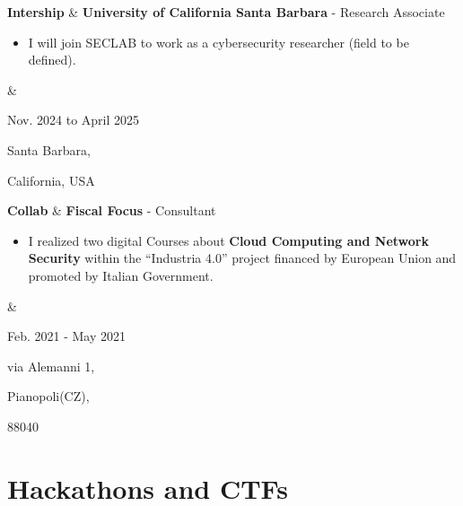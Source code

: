 \documentclass[10pt, letterpaper]{article}
\newenvironment{highlights}{
        \begin{itemize}[
                topsep=0pt,
                parsep=0.10 cm,
                partopsep=0pt,
                itemsep=0pt,
                after=\vspace{-1\baselineskip},
                leftmargin=0.4 cm + 3pt
            ]
    }{
        \end{itemize}
    } %
\let\originalTabularx\tabularx
\let\originalEndTabularx\endtabularx
\renewenvironment{tabularx}{\bgroup\centering\originalTabularx}{\originalEndTabularx\par\egroup}
\begin{document}
    
        
\begin{tabularx}{
    \textwidth-0.4 cm-0.13cm
}{
    L{2cm}
    K{0.85 cm}
    R{4.1 cm}
}
    \textbf{Intership}
    &
    \textbf{University of California Santa Barbara} - Research Associate 

    \vspace{0.20 cm}

    \begin{highlights}
    \item[] I will join SECLAB to work as a cybersecurity researcher (field to be defined).
    \end{highlights}
    &

    Nov. 2024 to April 2025

    Santa Barbara, 

    California, USA
\end{tabularx}     

\begin{tabularx}{
    \textwidth-0.4 cm-0.13cm
}{
    L{2cm}
    K{0.85 cm}
    R{4.1 cm}
}
    \textbf{Collab}
    &
    \textbf{Fiscal Focus} - Consultant

    \vspace{0.20 cm}

    \begin{highlights}
    \item[] I realized two digital Courses about\textbf{ Cloud Computing and Network Security} within the “Industria 4.0” project financed by European Union and promoted by Italian Government.
    \end{highlights}
    &

    Feb. 2021 - May 2021

    via Alemanni 1,
    
    Pianopoli(CZ), 
    
    88040
\end{tabularx}     


    \section{Hackathons and CTFs}
\end{document}
